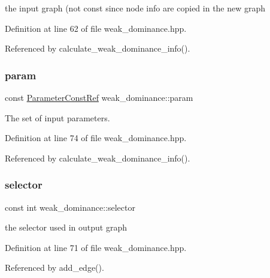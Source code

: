 the input graph (not const since node info are copied in the new graph 



Definition at line 62 of file weak\+\_\+dominance.\+hpp.



Referenced by calculate\+\_\+weak\+\_\+dominance\+\_\+info().

\mbox{\label{classweak__dominance_a5d3a2749ddef3b503fa43d8fb3a1c2fe}} 
\subsubsection{\texorpdfstring{param}{param}}
{\footnotesize\ttfamily const \hyperlink{Parameter_8hpp_a37841774a6fcb479b597fdf8955eb4ea}{Parameter\+Const\+Ref} weak\+\_\+dominance\+::param\hspace{0.3cm}{\ttfamily [private]}}



The set of input parameters. 



Definition at line 74 of file weak\+\_\+dominance.\+hpp.



Referenced by calculate\+\_\+weak\+\_\+dominance\+\_\+info().

\mbox{\label{classweak__dominance_a9d12594778b1fb4868e1a26bfdba53b8}} 
\subsubsection{\texorpdfstring{selector}{selector}}
{\footnotesize\ttfamily const int weak\+\_\+dominance\+::selector\hspace{0.3cm}{\ttfamily [private]}}



the selector used in output graph 



Definition at line 71 of file weak\+\_\+dominance.\+hpp.



Referenced by add\+\_\+edge().

\mbox{\label{classweak__dominance_a76b8a4cd058367c57e84d8f83f259722}} 
